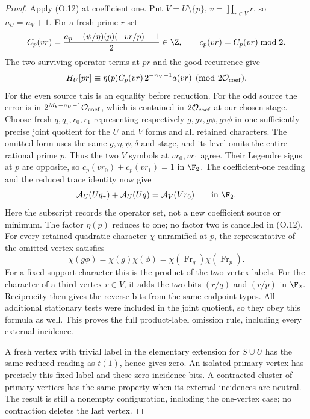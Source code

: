 \begin{proof}
Apply (O.12) at coefficient one.  Put $V=U\setminus\{p\}$,
$v=\prod_{r\in V}r$, so $n_U=n_V+1$.  For a fresh prime $r$ set
\[
 C_p(vr)=\frac{a_p-(\psi/\eta)(p)(-vr/p)-1}{2}\in\Z,
 \qquad c_p(vr)=C_p(vr)\bmod2.
\]
The two surviving operator terms at $pr$ and the good recurrence give
\[
 H_U[pr]\equiv
   \eta(p)C_p(vr)\,2^{-n_V-1}a(vr)\pmod{2\mathcal O_{\rm coef}}.
\]
For the even source this is an equality before reduction.  For the
odd source the error is in $2^{M_\theta-n_U-1}\mathcal O_{\rm coef}$,
which is contained in $2\mathcal O_{\rm coef}$ at our chosen stage.
Choose fresh $q,q_\tau,r_0,r_1$ representing respectively
$g,g\tau,g\phi,g\tau\phi$ in one sufficiently precise joint quotient
for the $U$ and $V$ forms and all retained characters.
The omitted form uses the same $g,\eta,\psi,\delta$ and stage,
and its level omits the entire rational prime $p$.
Thus the two $V$ symbols at $vr_0,vr_1$ agree.  Their Legendre
signs at $p$ are opposite, so $c_p(vr_0)+c_p(vr_1)=1$ in $\F_2$.
The coefficient-one reading and the reduced trace identity now give
\[
             \mathcal A_U(Uq_\tau)+\mathcal A_U(Uq)=\mathcal A_V(Vr_0)\qquad\text{in }\F_2.
\]
Here the subscript records the operator set, not a new coefficient
source or minimum. The factor $\eta(p)$ reduces to one; no factor
two is cancelled in (O.12). For every retained quadratic character
$\chi$ unramified at $p$, the representative of the omitted vertex
satisfies
\[
 \chi(g\phi)=\chi(g)\chi(\phi)
            =\chi(\operatorname{Fr}_q)\chi(\operatorname{Fr}_p).
\]
For a fixed-support character this is the product of the two vertex
labels. For the character of a third vertex $r\in V$, it adds the
two bits $(r/q)$ and $(r/p)$ in $\F_2$. Reciprocity then gives the
reverse bits from the same endpoint types. All additional stationary
tests were included in the joint quotient, so they obey this formula
as well. This proves the full product-label omission rule, including
every external incidence.

A fresh vertex with trivial label in the elementary extension for
$S\cup U$ has the same reduced reading as $t(1)$, hence gives zero.
An isolated primary vertex has precisely this fixed label and these
zero incidence bits. A contracted cluster of primary vertices has
the same property when its external incidences are neutral. The
result is still a nonempty configuration, including the one-vertex
case; no contraction deletes the last vertex.


\end{proof}
